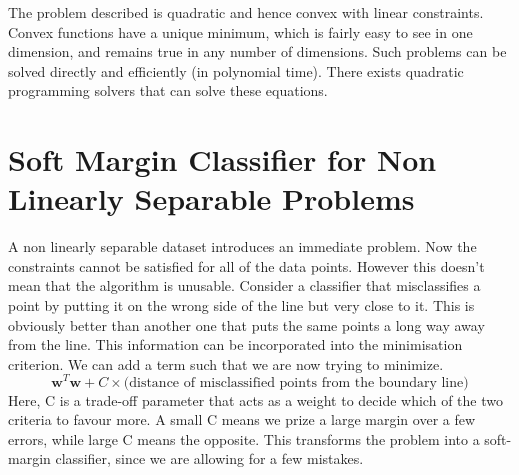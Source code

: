 \documentclass{../template/texnote}
\begin{document}
The problem described is quadratic and hence convex with linear constraints. Convex functions have a unique minimum, which is fairly easy to see in one dimension, and remains true in any number of dimensions. Such problems can be solved directly and efficiently (in polynomial time). There exists quadratic programming solvers that can solve these equations.


\section{Soft Margin Classifier for Non Linearly Separable Problems}
A non linearly separable dataset introduces an immediate problem.
Now the constraints cannot be satisfied for all of the data points. However this doesn't mean that the algorithm is unusable.
Consider a classifier that misclassifies a point by putting it on the wrong side of the line but very close to it. %
This is obviously better than another one that puts the same points a long way away from the line.
This information can be incorporated into the minimisation criterion. We can add a term such that we are now trying to minimize. $$\mathbf{w}^T\mathbf{w}+ C \times \textrm{(distance of misclassified points from the boundary line)}$$ Here, C is a trade-off parameter that acts as a weight to decide which of the two criteria to favour more. A small C means we prize a large margin over a few errors, while large C means the opposite. This transforms the problem into a soft-margin classifier, since we are allowing for a few mistakes.
\end{document}
